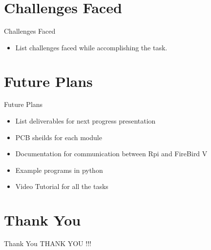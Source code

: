 \documentclass[10pt, a4paper]{beamer}
\begin{document}
\section{Challenges Faced}
\begin{frame}{Challenges Faced}
	\begin{itemize}
		\item List challenges faced while accomplishing the task.  
	\end{itemize}
\end{frame}

\section{Future Plans}
\begin{frame}{Future Plans}
	\begin{itemize}
		\item List deliverables for next progress presentation  
		\item PCB sheilds for each module
		\item Documentation for communication between Rpi and FireBird V
		\item Example programs in python
		\item Video Tutorial for all the tasks 
	\end{itemize}
\end{frame}


\section{Thank You}
\begin{frame}{Thank You}
	\centering THANK YOU !!!
\end{frame}
\end{document}
